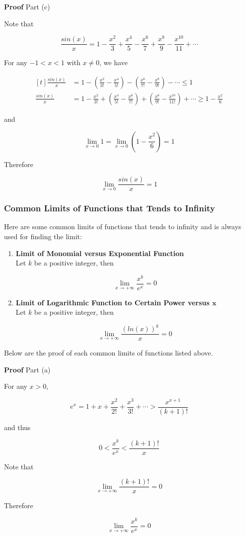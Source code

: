 \documentclass[a4paper,12pt]{article}
\newcommand{\s}{\vspace{1mm}}
\newcommand{\n}{\vspace{3mm}}
\newenvironment{block}[4][Block]{ %
\begin{list}{}{
  \setlength{\leftmargin}{0mm}
  \setlength{\rightmargin}{0mm}
  \setlength{\topsep}{0mm}
  \setlength{\partopsep}{0mm}
  \parsep\parskip
  \setlength{\itemsep}{-\parsep}
  }
  \needspace{\baselineskip}
  \item \textbf{#2 #3} \hspace{1mm} #4
  \vspace{1mm}
  \item
  }
{
\end{list}
}
\newenvironment{alist}{ %
\begin{enumerate}[label=(\alph*)]
}{
\end{enumerate}
}
\begin{document}
\begin{block}{Proof}{}{Part (c)}
  Note that

  $$\frac{sin(x)}{x}=1-\frac{x^{2}}{3}+\frac{x^{4}}{5}-\frac{x^{6}}{7}+\frac{x^{8}}{9}-\frac{x^{10}}{11}+\cdots$$\s

  For any $-1<x<1$ with $x\neq 0$, we have

  $$\begin{aligned}[t]
    \frac{sin(x)}{x}&=1-(\frac{x^{2}}{3!}-\frac{x^{4}}{5!})-(\frac{x^{6}}{7!}-\frac{x^{8}}{9!})-\cdots \leq 1\\
    \frac{sin(x)}{x}&=1-\frac{x^{2}}{3!}+(\frac{x^{4}}{5!}-\frac{x^{6}}{7!})+(\frac{x^{8}}{9!}-\frac{x^{10}}{11!})+\cdots \geq 1-\frac{x^{2}}{6}
  \end{aligned}$$\s

  and

  $$\lim_{x\to 0}1=\lim_{x\to 0}(1-\frac{x^{2}}{6})=1$$

  Therefore

  $$\lim_{x\to 0}\frac{sin(x)}{x}=1$$

\end{block}

\subsubsection{Common Limits of Functions that Tends to Infinity}
Here are some common limits of functions that tends to infinity and is always used for finding the limit:

\begin{alist}
  \item \textbf{Limit of Monomial versus Exponential Function}\\
  Let $k$ be a positive integer, then

  $$\lim_{x\to +\infty}\frac{x^{k}}{e^{x}}=0$$

  \item \textbf{Limit of Logarithmic Function to Certain Power versus $\boldsymbol{x}$}\\
  Let $k$ be a positive integer, then

  $$\lim_{x\to +\infty}\frac{(ln(x))^{k}}{x}=0$$

\end{alist}

Below are the proof of each common limits of functions listed above.\n

\begin{block}{Proof}{}{Part (a)}
  For any $x>0$,

  $$e^{x}=1+x+\frac{x^{2}}{2!}+\frac{x^{3}}{3!}+\cdots>\frac{x^{x+1}}{(k+1)!}$$\s

  and thus

  $$0<\frac{x^{k}}{e^{x}}<\frac{(k+1)!}{x}$$\s

  Note that

  $$\lim_{x\to +\infty}\frac{(k+1)!}{x}=0$$\s

  Therefore

  $$\lim_{x\to +\infty}\frac{x^{k}}{e^{x}}=0$$

\end{block}\n
\end{document}
